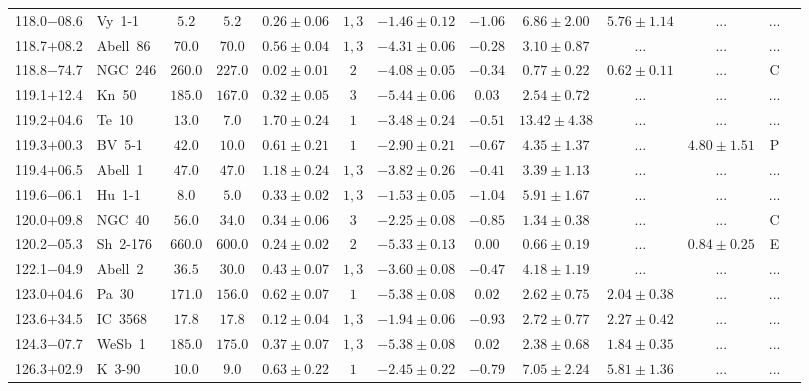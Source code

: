 \documentclass[useAMS]{mn2e}
\begin{document}
\begin{center}
{\begin{longtable}{llccccccccccc}
118.0$-$08.6&Vy~1-1&$       5.2$&$       5.2$&$0.26 \pm 0.06$&$1,3$&$-1.46 \pm 0.12$&$     -1.06$&$6.86 \pm 2.00$&$5.76 \pm 1.14$&$...$&...\\
118.7$+$08.2&Abell~86&$      70.0$&$      70.0$&$0.56 \pm 0.04$&$1,3$&$-4.31 \pm 0.06$&$     -0.28$&$3.10 \pm 0.87$&$...$&$...$&...\\
118.8$-$74.7&NGC~246&$     260.0$&$     227.0$&$0.02 \pm 0.01$&$2$&$-4.08 \pm 0.05$&$     -0.34$&$0.77 \pm 0.22$&$0.62 \pm 0.11$&$...$&C\\
119.1$+$12.4&Kn~50&$     185.0$&$     167.0$&$0.32 \pm 0.05$&$3$&$-5.44 \pm 0.06$&$      0.03$&$2.54 \pm 0.72$&$...$&$...$&...\\
119.2$+$04.6&Te~10&$      13.0$&$       7.0$&$1.70 \pm 0.24$&$1$&$-3.48 \pm 0.24$&$     -0.51$&$13.42 \pm 4.38$&$...$&$...$&...\\
119.3$+$00.3&BV~5-1&$      42.0$&$      10.0$&$0.61 \pm 0.21$&$1$&$-2.90 \pm 0.21$&$     -0.67$&$4.35 \pm 1.37$&$...$&$4.80 \pm 1.51$&P\\
119.4$+$06.5&Abell~1&$      47.0$&$      47.0$&$1.18 \pm 0.24$&$1,3$&$-3.82 \pm 0.26$&$     -0.41$&$3.39 \pm 1.13$&$...$&$...$&...\\
119.6$-$06.1&Hu~1-1&$       8.0$&$       5.0$&$0.33 \pm 0.02$&$1,3$&$-1.53 \pm 0.05$&$     -1.04$&$5.91 \pm 1.67$&$...$&$...$&...\\
120.0$+$09.8&NGC~40&$      56.0$&$      34.0$&$0.34 \pm 0.06$&$3$&$-2.25 \pm 0.08$&$     -0.85$&$1.34 \pm 0.38$&$...$&$...$&C\\
120.2$-$05.3&Sh~2-176&$     660.0$&$     600.0$&$0.24 \pm 0.02$&$2$&$-5.33 \pm 0.13$&$      0.00$&$0.66 \pm 0.19$&$...$&$0.84 \pm 0.25$&E\\
122.1$-$04.9&Abell~2&$      36.5$&$      30.0$&$0.43 \pm 0.07$&$1,3$&$-3.60 \pm 0.08$&$     -0.47$&$4.18 \pm 1.19$&$...$&$...$&...\\
123.0$+$04.6&Pa~30&$     171.0$&$     156.0$&$0.62 \pm 0.07$&$1$&$-5.38 \pm 0.08$&$      0.02$&$2.62 \pm 0.75$&$2.04 \pm 0.38$&$...$&...\\
123.6$+$34.5&IC~3568&$      17.8$&$      17.8$&$0.12 \pm 0.04$&$1,3$&$-1.94 \pm 0.06$&$     -0.93$&$2.72 \pm 0.77$&$2.27 \pm 0.42$&$...$&...\\
124.3$-$07.7&WeSb~1&$     185.0$&$     175.0$&$0.37 \pm 0.07$&$1,3$&$-5.38 \pm 0.08$&$      0.02$&$2.38 \pm 0.68$&$1.84 \pm 0.35$&$...$&...\\
126.3$+$02.9&K~3-90&$      10.0$&$       9.0$&$0.63 \pm 0.22$&$1$&$-2.45 \pm 0.22$&$     -0.79$&$7.05 \pm 2.24$&$5.81 \pm 1.36$&$...$&...\\

\end{longtable}}
\end{center}
\end{document}
